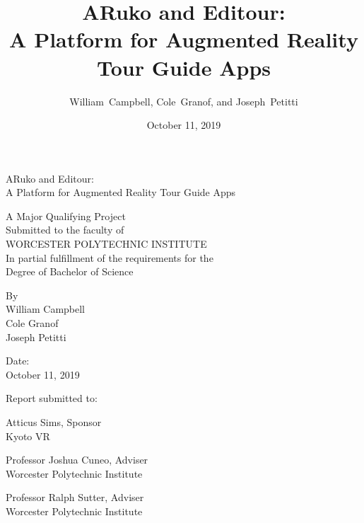 \documentclass[a4paper, 10pt, american, titlepage]{article}
\title{%
	\huge ARuko and Editour: \\
	\Large A Platform for Augmented Reality Tour Guide Apps}
\author{William~Campbell, Cole~Granof, and Joseph~Petitti}
\date{October 11, 2019}
\begin{document}

\begin{center}
	{\huge ARuko and Editour: \\
		\Large A Platform for Augmented Reality Tour Guide Apps
	}

	\vfill

	A Major Qualifying Project \\
	Submitted to the faculty of \\
	WORCESTER POLYTECHNIC INSTITUTE \\
	In partial fulfillment of the requirements for the \\
	Degree of Bachelor of Science \par

	\vfill

	By \\
	William Campbell \\
	Cole Granof \\
	Joseph Petitti \par

	\vfill

	Date: \\
	October 11, 2019 \par

	\vfill

	Report submitted to: \par

	\vspace{\baselineskip}

\end{center}
\begin{flushright} %
	Atticus Sims, Sponsor \\
	Kyoto VR \par
	\vspace{\baselineskip}
	Professor Joshua Cuneo, Adviser \\
	Worcester Polytechnic Institute \par
	\vspace{\baselineskip}
	Professor Ralph Sutter, Adviser \\
	Worcester Polytechnic Institute \par
\end{flushright}

\vfill

\clearpage

\end{document}
